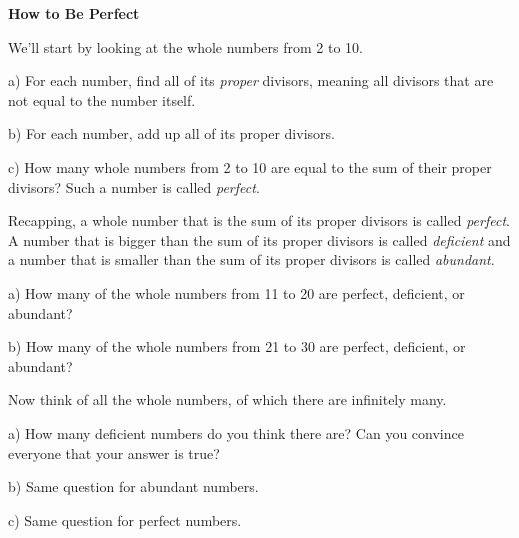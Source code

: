 \documentclass[12pt]{article}
\newcommand{\numb}[1]{\noindent{\bf #1)}}
\begin{document}
\centerline{\bf How to Be Perfect}


\bigskip


\bigskip

\numb{1} We'll start by looking at the whole numbers from 2 to 10.

\bigskip

a) For each number, find all of its \textit{proper} divisors, meaning all divisors that are not equal to the number itself. 

\bigskip

b) For each number, add up all of its proper divisors.

\bigskip

c) How many whole numbers from 2 to 10 are equal to the sum of their proper divisors? Such a number is called \textit{perfect}.


\newpage

\numb{2} Recapping, a whole number that is the sum of its proper divisors is called \textit{perfect}. A number that is bigger than the sum of its proper divisors is called \textit{deficient} and a number that is smaller than the sum of its proper divisors is called \textit{abundant}.

\bigskip

a) How many of the whole numbers from 11 to 20 are perfect, deficient, or abundant?

\bigskip

b) How many of the whole numbers from 21 to 30 are perfect, deficient, or abundant?



\newpage 


\numb{3} Now think of all the whole numbers, of which there are infinitely many.

\bigskip

a) How many deficient numbers do you think there are? Can you convince everyone that your answer is true? 

\bigskip

b) Same question for abundant numbers. 

\bigskip

c) Same question for perfect numbers. 
\end{document}
